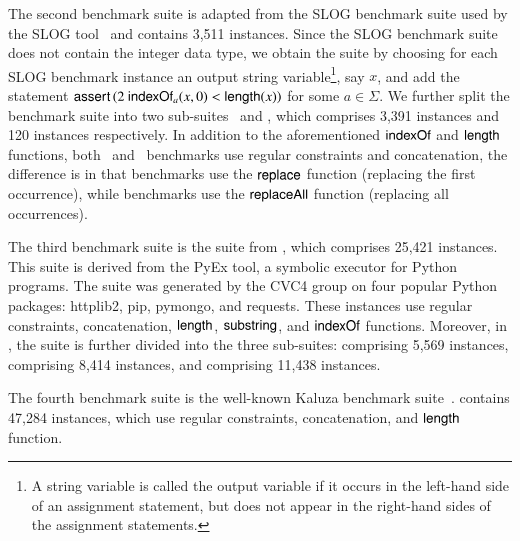 The second benchmark suite {\slogbench} is adapted from the SLOG benchmark suite used by the SLOG tool~\cite{fang-yu-circuits} and contains 3,511 instances. 
Since the SLOG benchmark suite does not contain the integer data type,
we obtain the {\slogbench} suite by choosing for each SLOG benchmark instance an output string variable\footnote{A string variable is called the output variable if it occurs in the left-hand side of an assignment statement, but does not appear in the right-hand sides of the assignment statements.}, say $x$, and add the statement $\ASSERT{2\ \indexof_{a}(x, 0) < \length(x)}$ for some $a \in \Sigma$.
We further split the {\slogbench} benchmark suite into two sub-suites \slogbenchr\ and \slogbenchra, which comprises 3,391 instances and 120 instances respectively. In addition to the aforementioned $\mathsf{indexOf}$ and $\mathsf{length}$ functions, both  \slogbenchr\ and \slogbenchra\ benchmarks use regular constraints and concatenation, the difference is in that {\slogbenchr} benchmarks use the $\mathsf{replace}$ function (replacing the first occurrence), while {\slogbenchra} benchmarks use the $\mathsf{replaceAll}$ function (replacing all occurrences).


The third benchmark suite is the {\pyexbench} suite from \cite{ReynoldsWBBLT17}, which comprises 25,421 instances. 
This suite is derived from the PyEx tool, a symbolic executor for Python programs. The {\pyexbench} suite was generated by the CVC4 group on four popular Python packages: httplib2, pip, pymongo, and requests. These instances use regular constraints, concatenation, $\mathsf{length}$, $\mathsf{substring}$, and $\mathsf{indexOf}$ functions. Moreover, in  \cite{ReynoldsWBBLT17}, the {\pyexbench} suite is further divided into the three sub-suites: {\pyextdbench} comprising 5,569 instances, {\pyexztbench} comprising 8,414 instances, and {\pyexzzbench} comprising 11,438 instances.

The fourth benchmark suite {\kaluzabench} is the well-known Kaluza benchmark suite~\cite{Berkeley-JavaScript}.
{\kaluzabench} contains 47,284 instances, which use regular constraints, concatenation, and $\mathsf{length}$ function.





